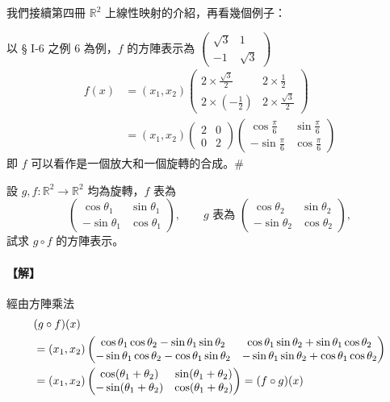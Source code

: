 我們接續第四冊 $\mathbb{R}^2$ 上線性映射的介紹，再看幾個例子：

\begin{example}\label{ex:b6s-1-37}
以 § I-6 之例 6 為例，$f$ 的方陣表示為 $\begin{pmatrix} \sqrt{3} & 1 \\ -1 & \sqrt{3} \end{pmatrix}$
\begin{align*}
f(x) &= (x_1, x_2) \begin{pmatrix} 2 \times \frac{\sqrt{3}}{2} & 2 \times \frac{1}{2} \\ 2 \times (-\frac{1}{2}) & 2 \times \frac{\sqrt{3}}{2} \end{pmatrix} \\
&= (x_1, x_2) \begin{pmatrix} 2 & 0 \\ 0 & 2 \end{pmatrix} \begin{pmatrix} \cos\frac{\pi}{6} & \sin\frac{\pi}{6} \\ -\sin\frac{\pi}{6} & \cos\frac{\pi}{6} \end{pmatrix}
\end{align*}
即 $f$ 可以看作是一個放大和一個旋轉的合成。\hfill$\#$
\end{example}

\begin{discussion}\label{disc:b6s-1-4}
設 $g, f: \mathbb{R}^2 \longrightarrow \mathbb{R}^2$ 均為旋轉，$f$ 表為
\[ \begin{pmatrix} \cos\theta_1 & \sin\theta_1 \\ -\sin\theta_1 & \cos\theta_1 \end{pmatrix}, \qquad g \text{ 表為 } \begin{pmatrix} \cos\theta_2 & \sin\theta_2 \\ -\sin\theta_2 & \cos\theta_2 \end{pmatrix}, \]
試求 $g \circ f$ 的方陣表示。
\end{discussion}

\paragraph{【解】}
經由方陣乘法
\begin{align}
&(g \circ f)(x) \notag \\
&= (x_1, x_2) \begin{pmatrix}
\cos\theta_1\cos\theta_2 - \sin\theta_1\sin\theta_2 & \cos\theta_1\sin\theta_2 + \sin\theta_1\cos\theta_2 \\
-\sin\theta_1\cos\theta_2 - \cos\theta_1\sin\theta_2 & -\sin\theta_1\sin\theta_2 + \cos\theta_1\cos\theta_2
\end{pmatrix} \notag \\
&= (x_1, x_2) \begin{pmatrix}
\cos(\theta_1+\theta_2) & \sin(\theta_1+\theta_2) \\
-\sin(\theta_1+\theta_2) & \cos(\theta_1+\theta_2)
\end{pmatrix} = (f \circ g)(x) \label{eq:b6s-1-7-9}
\end{align}

